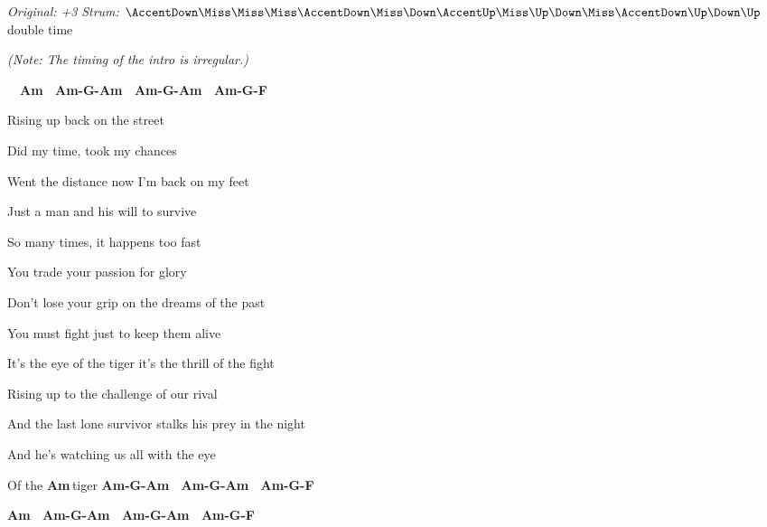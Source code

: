\begin{song}


\begin{headerbox}
\RaiseBoxWithAccents
\textit{Original: +3} \quad
\textit{Strum:} $\AccentDown\Miss\Miss\Miss\AccentDown\Miss\Down\AccentUp \Miss\Up\Down\Miss\AccentDown\Up\Down\Up$ double time
\end{headerbox}

\begin{hchordbox}
\end{hchordbox}

\Large


\bigskip

{
\it \smaller (Note: The timing of the intro is irregular.)
}

\bigskip

\Intro\ \  
\textbf{Am \ Am-G-Am \ Am-G-Am \ Am-G-F \ }  \par

\bigskip

 Rising up back on the street \par
{} Did my time, took my chances \par
{} Went the distance now I’m back on my feet \par
Just a \ch{G}man and his will to sur\ch{Am}vive \par

\bigskip

 So many times, it happens too fast \par
{} You trade your passion for glory \par
{} Don’t lose your grip on the dreams of the past \par
You must \ch{G}fight just to keep them a\ch{Am}live \par

\bigskip

\begin{chorusbox}{\Chorus}
It’s the  eye of the tiger it’s the thrill of the fight \par
Rising up to the challenge of our \ch{C\beat}ri\ch{G\beats3}val \par
And the \ch{Dm}last lone survivor stalks his prey in the night \par
And he’s \ch{Dm\beats2}watching us \ch{C\beats2}all with the \ch{F\rep2}eye \par
Of the \textbf{Am\,}tiger \textbf{Am-G-Am \ Am-G-Am \ Am-G-F \ } \par
\textbf{Am \ Am-G-Am \ Am-G-Am \ Am-G-F \ } \par
\end{chorusbox}


\end{song}
